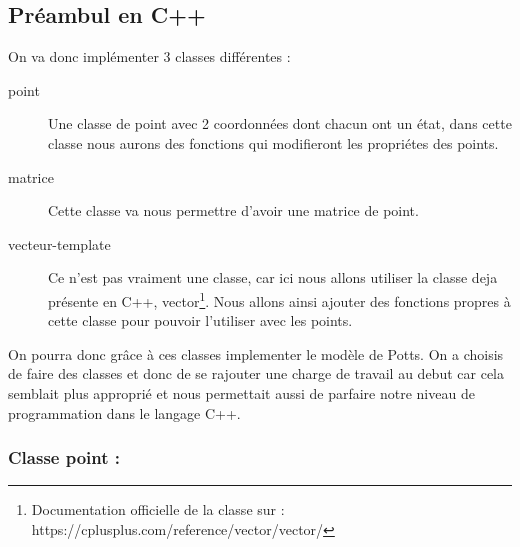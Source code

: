 \begin{article}
    \subsection{Préambul en C++}\label{subsec:preambul-en-c++}
    \noindent On va donc implémenter 3 classes différentes :
    \begin{description}
        \item[point] Une classe de point avec 2 coordonnées dont chacun ont un état, dans cette classe nous aurons des fonctions qui modifieront les propriétes des points.
        \item[matrice] Cette classe va nous permettre d'avoir une matrice de point.
        \item[vecteur-template] Ce n'est pas vraiment une classe, car ici nous allons utiliser la classe deja présente en C++, vector\footnote{Documentation officielle de la classe sur : https://cplusplus.com/reference/vector/vector/}.
        Nous allons ainsi ajouter des fonctions propres à cette classe pour pouvoir l'utiliser avec les points.
    \end{description}
    \newline
    \newline
    On pourra donc grâce à ces classes implementer le modèle de Potts.
    \newline On a choisis de faire des classes et donc de se rajouter une charge de travail au debut car cela semblait plus approprié et nous permettait aussi de parfaire notre niveau de programmation dans le langage C++.

    \subsubsection{Classe point :}


\end{article}
